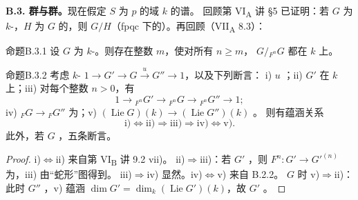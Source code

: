 \textbf{B.3. 群与群。}现在假定 $S$ 为 $p$ 的域 $k$ 的谱。
回顾第 VI\textsubscript{A} 讲 §5 已证明：若 $G$ 为 $k$-，$H$ 为 $G$ 的，则 $G/H$（fpqc 下的）。再回顾（VII\textsubscript{A} 8.3）：
\begin{SGAresult}{命题}{B.3.1}
设 $G$ 为 $k$-。则存在整数 $m$，使对所有 $n\geq m$， $G/{}_{F^n}G$ 都在 $k$ 上。
\end{SGAresult}
\begin{SGAresult}{命题}{B.3.2}
考虑 $k$- $1\to G'\to G\xrightarrow uG''\to1$，以及下列断言：
i)  $u$ ；ii) $G'$ 在 $k$ 上；iii) 对每个整数 $n>0$，有
\[1\longrightarrow{}_{F^n}G'\longrightarrow{}_{F^n}G\longrightarrow{}_{F^n}G''\longrightarrow1;\]
iv)  ${}_FG\to{}_FG''$ 为；v)  $(\operatorname{Lie}G)(k)\to(\operatorname{Lie}G'')(k)$ 。
则有蕴涵关系
\[\text{i)}\Longleftrightarrow\text{ii)}\Longrightarrow\text{iii)}\Longrightarrow\text{iv)}\Longleftrightarrow\text{v)}.\]
此外，若 $G$ ，五条断言。
\end{SGAresult}
\begin{proof}
i)$\Leftrightarrow$ii) 来自第 VI\textsubscript{B} 讲 9.2 vii)。
ii)$\Rightarrow$iii)：若 $G'$ ，则 $F^n:G'\to G'^{(n)}$ 为，iii) 由“蛇形”图得到。
iii)$\Rightarrow$iv) 显然。iv)$\Leftrightarrow$v) 来自 B.2.2。
$G$ 时 v)$\Rightarrow$ii)：此时 $G''$ ，v) 蕴涵 $\dim G'=\dim_k(\operatorname{Lie}G')(k)$，故 $G'$ 。
\end{proof}

